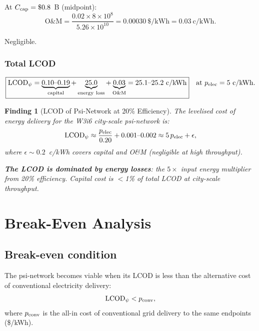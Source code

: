 \documentclass[11pt]{article}
\newtheorem{finding}{Finding}
\newcommand{\ee}[1]{\times 10^{#1}}
\begin{document}
At $C_{\rm cap} = \$0.8$~B (midpoint):
\begin{equation}
\text{O\&M} = \frac{0.02\times 8\ee{8}}{5.26\ee{10}}
= 0.00030~\$/\text{kWh} = 0.03~\text{c/kWh}.
\end{equation}

Negligible.

\subsubsection{Total LCOD}

\begin{equation}
\boxed{
\text{LCOD}_\psi = \underbrace{0.10\text{--}0.19}_{\rm capital}
+ \underbrace{25.0}_{\rm energy~loss}
+ \underbrace{0.03}_{\rm O\&M}
= 25.1\text{--}25.2~\text{c/kWh}}
\quad\text{at $p_{\rm elec} = 5$~c/kWh.}
\end{equation}

\begin{finding}[LCOD of Psi-Network at 20\% Efficiency]
\label{find:LCOD}
The levelised cost of energy delivery for the W3i6 city-scale psi-network
is:
\begin{equation}
\text{LCOD}_\psi \approx \frac{p_{\rm elec}}{0.20} + 0.001\text{--}0.002
\approx 5\,p_{\rm elec} + \epsilon,
\end{equation}
where $\epsilon \sim 0.2$~c/kWh covers capital and O\&M (negligible at
high throughput).

\textbf{The LCOD is dominated by energy losses}: the $5\times$ input
energy multiplier from 20\% efficiency. Capital cost is $<$1\% of total
LCOD at city-scale throughput.
\end{finding}

\section{Break-Even Analysis}
\label{sec:P12-breakeven}

\subsection{Break-even condition}

The psi-network becomes viable when its LCOD is less than the alternative
cost of conventional electricity delivery:
\begin{equation}
\text{LCOD}_\psi < p_{\rm conv},
\end{equation}
where $p_{\rm conv}$ is the all-in cost of conventional grid delivery
to the same endpoints (\$/kWh).
\end{document}
